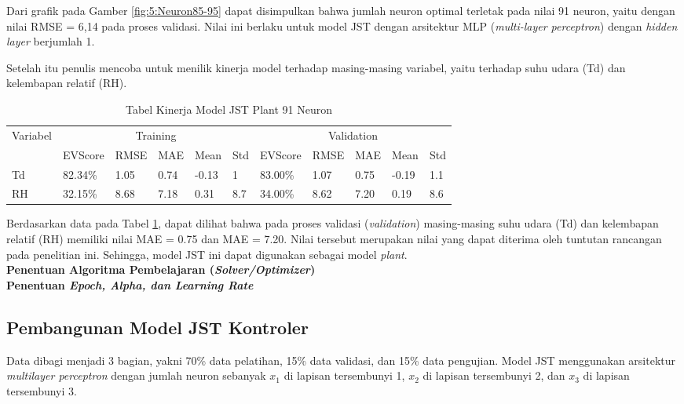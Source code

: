 Dari grafik pada Gamber \ref{fig:5:Neuron85-95} dapat disimpulkan bahwa jumlah neuron optimal terletak pada nilai 91 neuron, yaitu dengan nilai RMSE = 6,14 pada proses validasi. Nilai ini berlaku untuk model JST dengan arsitektur MLP (\textit{multi-layer perceptron}) dengan \textit{hidden layer} berjumlah 1.

Setelah itu penulis mencoba untuk menilik kinerja model terhadap masing-masing variabel, yaitu terhadap suhu udara (Td) dan kelembapan relatif (RH).
\begin{table}[!h]
	\caption{Tabel Kinerja Model JST Plant 91 Neuron}
	\label{tbl:5:Performance}
	\centering
	\begin{tabular}{|p{1.3cm}|p{1.4cm}|p{1cm}|p{0.8cm}|p{0.9cm}|p{0.5cm}|p{1.4cm}|p{1cm}|p{0.8cm}|p{0.9cm}|p{0.5cm}|}
		\hline
		\multirow{2}{*}{Variabel} & \multicolumn{5}{|c|}{Training} & \multicolumn{5}{|c|}{Validation} \\
		\cline{2-11}	
		& EVScore & RMSE & MAE & Mean & Std & EVScore & RMSE & MAE & Mean & Std \\
		\hline
		Td & 82.34\% & 1.05 & 0.74 & -0.13 & 1 & 83.00\% & 1.07 &  0.75 & -0.19 & 1.1 \\
		\hline
		RH & 32.15\% & 8.68 & 7.18 & 0.31 & 8.7 & 34.00\% & 8.62 & 7.20 & 0.19 & 8.6 \\
		\hline
	\end{tabular}
\end{table}

Berdasarkan data pada Tabel \ref{tbl:5:Performance}, dapat dilihat bahwa pada proses validasi (\textit{validation}) masing-masing suhu udara (Td) dan kelembapan relatif (RH) memiliki nilai MAE = 0.75 dan MAE = 7.20. Nilai tersebut merupakan nilai yang dapat diterima oleh tuntutan rancangan pada penelitian ini. Sehingga, model JST ini dapat digunakan sebagai model \textit{plant}. \\

\noindent \textbf{Penentuan Algoritma Pembelajaran (\textit{Solver/Optimizer})} \\

\noindent \textbf{Penentuan \textit{Epoch, Alpha, dan Learning Rate}} \\

\subsection{Pembangunan Model JST Kontroler}
Data dibagi menjadi 3 bagian, yakni 70\% data pelatihan, 15\% data validasi, dan 15\% data pengujian. Model JST menggunakan arsitektur \textit{multilayer perceptron} dengan jumlah neuron sebanyak $x_1$ di lapisan tersembunyi 1, $x_2$ di lapisan tersembunyi 2, dan $x_3$ di lapisan tersembunyi 3.

